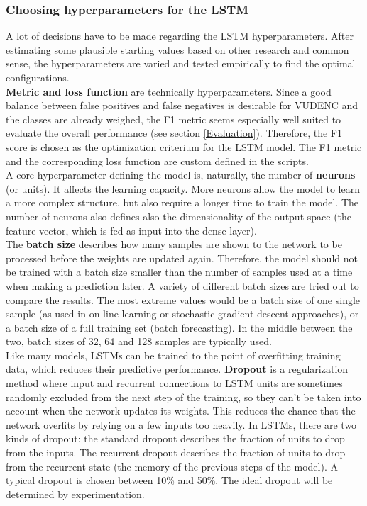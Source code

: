 \documentclass[
a4paper,
pagesize,
pdftex,
12pt,
twoside, %
BCOR=5mm, %
ngerman,
fleqn,
final,
]{scrartcl}
\begin{document}
	\subsubsection{Choosing hyperparameters for the LSTM}
	A lot of decisions have to be made regarding the LSTM hyperparameters. After estimating some plausible starting values based on other research and common sense, the hyperparameters are varied and tested empirically to find the optimal configurations.\\
	\textbf{Metric and loss function} are technically hyperparameters. Since a good balance between false positives and false negatives is desirable for VUDENC and the classes are already weighed, the F1 metric seems especially well suited to evaluate the overall performance (see section \ref{Evaluation}). Therefore, the F1 score is chosen as the optimization criterium for the LSTM model. The F1 metric and the corresponding loss function are custom defined in the scripts.\\
	A core hyperparameter defining the model is, naturally, the number of \textbf{neurons} (or units). It affects the learning capacity. More neurons allow the model to learn a more complex structure, but also require a longer time to train the model. The number of neurons also defines also the dimensionality of the output space (the feature vector, which is fed as input into the dense layer).\\  
	The \textbf{batch size} describes how many samples are shown to the network to be processed before the weights are updated again. Therefore, the model should not be trained with a batch size smaller than the number of samples used at a time when making a prediction later. A variety of different batch sizes are tried out to compare the results. The most extreme values would be a batch size of one single sample (as used in on-line learning or stochastic gradient descent approaches), or a batch size of a full training set (batch forecasting). In the middle between the two, batch sizes of 32, 64 and 128 samples are typically used.\\
	Like many models, LSTMs can be trained to the point of overfitting training data, which reduces their predictive performance. \textbf{Dropout} is a regularization method where input and recurrent connections to LSTM units are sometimes randomly excluded from the next step of the training, so they can't be taken into account when the network updates its weights. This reduces the chance that the network overfits by relying on a few inputs too heavily. In LSTMs, there are two kinds of dropout: the standard dropout describes the fraction of units to drop from the inputs. The recurrent dropout describes the fraction of units to drop from the recurrent state (the memory of the previous steps of the model). A typical dropout is chosen between 10\% and 50\%. The ideal dropout will be determined by experimentation.\\
\end{document}

